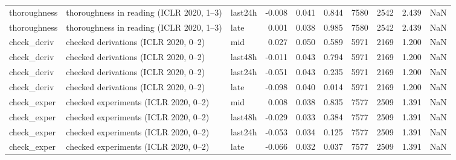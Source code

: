 \begin{table}
\begin{tabular}{lllrrrrrrr}
thoroughness & thoroughness in reading (ICLR 2020, 1–3) & last24h & -0.008 & 0.041 & 0.844 & 7580 & 2542 & 2.439 & NaN \\
thoroughness & thoroughness in reading (ICLR 2020, 1–3) & late & 0.001 & 0.038 & 0.985 & 7580 & 2542 & 2.439 & NaN \\
check\_deriv & checked derivations (ICLR 2020, 0–2) & mid & 0.027 & 0.050 & 0.589 & 5971 & 2169 & 1.200 & NaN \\
check\_deriv & checked derivations (ICLR 2020, 0–2) & last48h & -0.011 & 0.043 & 0.794 & 5971 & 2169 & 1.200 & NaN \\
check\_deriv & checked derivations (ICLR 2020, 0–2) & last24h & -0.051 & 0.043 & 0.235 & 5971 & 2169 & 1.200 & NaN \\
check\_deriv & checked derivations (ICLR 2020, 0–2) & late & -0.098 & 0.040 & 0.014 & 5971 & 2169 & 1.200 & NaN \\
check\_exper & checked experiments (ICLR 2020, 0–2) & mid & 0.008 & 0.038 & 0.835 & 7577 & 2509 & 1.391 & NaN \\
check\_exper & checked experiments (ICLR 2020, 0–2) & last48h & -0.029 & 0.033 & 0.384 & 7577 & 2509 & 1.391 & NaN \\
check\_exper & checked experiments (ICLR 2020, 0–2) & last24h & -0.053 & 0.034 & 0.125 & 7577 & 2509 & 1.391 & NaN \\
check\_exper & checked experiments (ICLR 2020, 0–2) & late & -0.066 & 0.032 & 0.037 & 7577 & 2509 & 1.391 & NaN \\
\bottomrule
\end{tabular}
\end{table}
